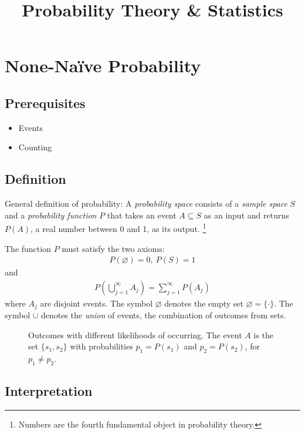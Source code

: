 \documentclass[11pt,a4paper]{article}
\title{Probability Theory \& Statistics}
\begin{document}
\maketitle
\newpage

\section{None-Naïve Probability}

\subsection{Prerequisites}

\begin{itemize}
\item Events
\item Counting
\end{itemize}

\subsection{Definition}

General definition of probability: 
A \emph{probability space} consists of a \emph{sample space} \(S\) 
and a \emph{probability function} \(P\) 
that takes an event \(A \subseteq S\) as an input and returns \(P(A)\), 
a real number between 0 and 1, as its output.%
\footnote{Numbers are the fourth fundamental object in probability theory.} 

The function \(P\) must satisfy the two axioms:
\begin{align}
P(\varnothing) = 0,\ P(S) = 1
\end{align}
and
\begin{align}
P\left( \bigcup_{j = 1}^{\infty}A_{j} \right) = \sum_{j = 1}^{\infty}{P(A_{j})}
\end{align}
where \(A_{j}\) are disjoint events.
The symbol \(\varnothing\) denotes the empty set \(\varnothing=\{\cdot\}\). 
The symbol \(\cup\) denotes the \emph{union} of events, 
the combination of outcomes from sets.

\begin{figure}[h!]
\centering

\caption{%
Outcomes with different likelihoods of occurring.
The event \(A\) is the set \(\{s_1, s_2\}\) with probabilities \(p_1=P(s_1)\) and
\(p_2=P(s_2)\),
for \(p_1 \neq p_2\).
}
\label{fig:outcomes}
\end{figure}

\subsection{Interpretation}
\end{document}
